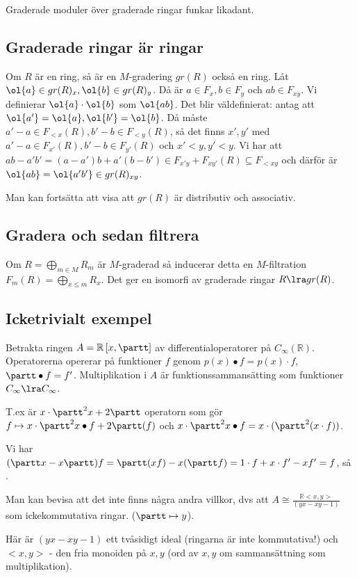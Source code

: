 Graderade moduler över graderade ringar funkar likadant.

\subsection{Graderade ringar är ringar}
Om $R$ är en ring, så är en $M$-gradering $gr(R)$ också en ring.
Låt $\ol{a}\in gr(R)_x, \ol{b}\in gr(R)_y$. Då är 
$a\in F_x, b\in F_y$ och $ab\in F_{xy}$.
Vi definierar $\ol{a}\cdot \ol{b}$ som 
$\ol{ab}$. Det blir väldefinierat:
antag att $\ol{a'} = \ol{a}, \ol{b'} = \ol{b}$.
Då måste $a'-a\in F_{<x}(R), b'-b\in F_{<y}(R)$, så
det finns $x', y'$ med $a'-a\in F_{x'}(R), b'-b\in F_{y'}(R)$
och $x'<y, y'<y$.
Vi har att $ab - a'b' = (a-a')b + a'(b-b') \in F_{x'y} + F_{xy'}(R)
\subseteq F_{<xy}$ och därför är $\ol{ab} = \ol{a'b'}\in gr(R)_{xy}$.

Man kan fortsätta att visa att $gr(R)$ är distributiv och associativ.

\subsection{Gradera och sedan filtrera}
Om $R = \bigoplus_{m\in M} R_m$ är $M$-graderad så inducerar detta
en $M$-filtration 
$F_m(R) = \bigoplus_{x\leq m} R_x$.
Det ger en isomorfi av graderade ringar $R \lra gr(R)$.


\subsection{Icketrivialt exempel}
Betrakta ringen $A = \mathbb{R}\left[x, \partt\right]$
av differentialoperatorer på $C_{\infty}(\mathbb{R})$.
Operatorerna opererar på funktioner $f$ genom
$p(x)\bullet f = p(x)\cdot f$, 
$\partt \bullet f = f'$.
Multiplikation i $A$ är funktionssammansätting
som funktioner $C_{\infty} \lra C_{\infty}$.

T.ex är $x\cdot \partt^2 x + 2\partt$
operatorn som gör 
$f \mapsto x\cdot \partt^2 x \bullet f + 2\partt(f)$
och $x\cdot \partt^2 x \bullet f = x\cdot(\partt^2 (x\cdot f))$.

Vi har 
$(\partt x - x \partt) f = \partt (xf) - x(\partt f) = 
1\cdot f + x\cdot f' - xf' = f$,
så .

Man kan bevisa att det inte finns några andra villkor, dvs att
$A\cong \frac{\mathbb{R}<x,y>}{(yx-xy-1)}$ som ickekommutativa ringar.
($\partt \mapsto y$).

Här är $(yx-xy-1)$ ett tvåsidigt ideal (ringarna är inte kommutativa!)
och $<x,y>$ - den fria monoiden på $x, y$ (ord av $x,y$ om sammansättning
som multiplikation).

